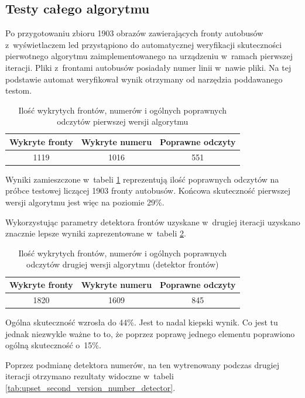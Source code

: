 \subsection{Testy całego algorytmu}

Po przygotowaniu zbioru 1903 obrazów zawierających fronty autobusów
z~wyświetlaczem led przystąpiono do automatycznej weryfikacji 
skuteczności pierwotnego algorytmu zaimplementowanego na urządzeniu
w~ramach pierwszej iteracji.
Pliki z~frontami autobusów posiadały numer linii w~nawie pliki. 
Na tej podstawie automat weryfikował wynik otrzymany od narzędzia
poddawanego testom.


\begin{table}[!h]
	\centering
	\begin{tabular}{c|c|c}
		Wykryte fronty  & Wykryte numeru & Poprawne odczyty \\ \hline
		1119 & 1016 & 551
	\end{tabular}
	\caption{Ilość wykrytych frontów, numerów i ogólnych poprawnych 
		odczytów pierwszej wersji algorytmu}
	\label{tab:first_version_results}
\end{table}

Wyniki zamieszczone w~tabeli \ref{tab:first_version_results}
reprezentują ilość poprawnych odczytów na próbce testowej
liczącej 1903 fronty autobusów. Końcowa skuteczność
pierwszej wersji algorytmu jest więc na poziomie 29\%.

Wykorzystując parametry detektora frontów uzyskane w~drugiej
iteracji uzyskano znacznie lepsze wyniki zaprezentowane w~tabeli
\ref{tab:second_version_results}.

\begin{table}[!h]
	\centering
	\begin{tabular}{c|c|c}
		Wykryte fronty  & Wykryte numeru & Poprawne odczyty \\ \hline
		1820 & 1609 & 845
	\end{tabular}
	\caption{Ilość wykrytych frontów, numerów i ogólnych poprawnych 
		odczytów drugiej wersji algorytmu (detektor frontów)}
	\label{tab:second_version_results}
\end{table}

Ogólna skuteczność wzrosła do 44\%. Jest to nadal kiepski wynik.
Co jest tu jednak niezwykle ważne to to, że 
poprzez poprawę jednego elementu
poprawiono ogólną skuteczność o~15\%.

Poprzez podmianę detektora numerów, na ten wytrenowany 
podczas drugiej iteracji otrzymano rezultaty widoczne
w~tabeli \ref{tab:upset_second_version_number_detector}.


